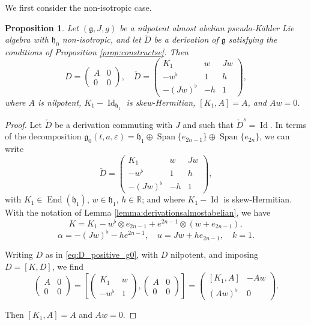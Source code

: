 \documentclass{article}
\newtheorem{proposition}[theorem]{Proposition}
\theoremstyle{definition}
\DeclareMathOperator{\Id}{Id}
\DeclareMathOperator{\End}{End}
\newcommand{\R}{\mathbb{R}}
\newcommand{\frg}{\mathfrak{g}}
\newcommand{\frh}{\mathfrak{h}}
\newcommand{\Span}[1]{\operatorname{Span}\{#1\}}
\newcommand{\lie}[1]{\mathfrak{#1}}
\newcommand{\g}{\lie g}
\newcommand{\h}{\lie h}
\begin{document}
We first consider the non-isotropic case.

\begin{proposition}\label{prop:ESnil_non-isotropic}
    Let $(\frg,J,g)$ be a nilpotent almost abelian pseudo-Kähler Lie algebra with $\frh_0$ non-isotropic, and let $\check D$ be a derivation of $\frg$ satisfying the conditions of Proposition \ref{prop:constructse}. Then \begin{equation}\label{eq:D_and_check_D_non_isotropic}
        D=\begin{pmatrix}
        A&0\\
        0&0
    \end{pmatrix},\quad\check{D}=\begin{pmatrix}
        K_1 & w & Jw\\
        -w^\flat & 1 & h\\
        -(Jw)^\flat & -h & 1
    \end{pmatrix},\end{equation} where $A$ is nilpotent, $K_1-\Id_{\frh_1}$ is skew-Hermitian, $[K_1,A]=A$, and $Aw=0$.
\end{proposition}

\begin{proof}
    Let $\check{D}$ be a derivation commuting with $J$ and such that $\check D^s=\Id$. In terms of the decomposition $\g_0(t,a,\varepsilon)=\h_1\oplus\Span{e_{2n-1}}\oplus\Span{e_{2n}}$, we can write $$\check{D}=\begin{pmatrix}
        K_1 & w & Jw\\
        -w^\flat & 1 & h\\
        -(Jw)^\flat & -h & 1
    \end{pmatrix},$$ with $K_1\in\End(\h_1)$, $w\in\h_1$, $h\in\R$; and where $K_1-\Id$ is skew-Hermitian. With the notation of Lemma \ref{lemma:derivationsalmostabelian}, we have $$K=K_1-w^\flat\otimes e_{2n-1} + e^{2n-1}\otimes (w + e_{2n-1}),$$ $$\alpha=-(Jw)^\flat - he^{2n-1},\quad u=Jw+he_{2n-1},\quad k=1.$$
    
    Writing $D$ as in \eqref{eq:D_positive_g0}, with $D$ nilpotent, and imposing $D=[K,D]$, we find $$\begin{pmatrix}
        A & 0 \\
        0 & 0
    \end{pmatrix}=\left[\begin{pmatrix}
        K_1 & w \\
        -w^\flat & 1
    \end{pmatrix},\begin{pmatrix}
        A & 0 \\
        0 & 0
    \end{pmatrix}\right]=\begin{pmatrix}
        [K_1,A] & -Aw \\
        (Aw)^\flat & 0
    \end{pmatrix}.$$

    Then $[K_1,A]=A$ and $Aw=0$.
\end{proof}
\end{document}
